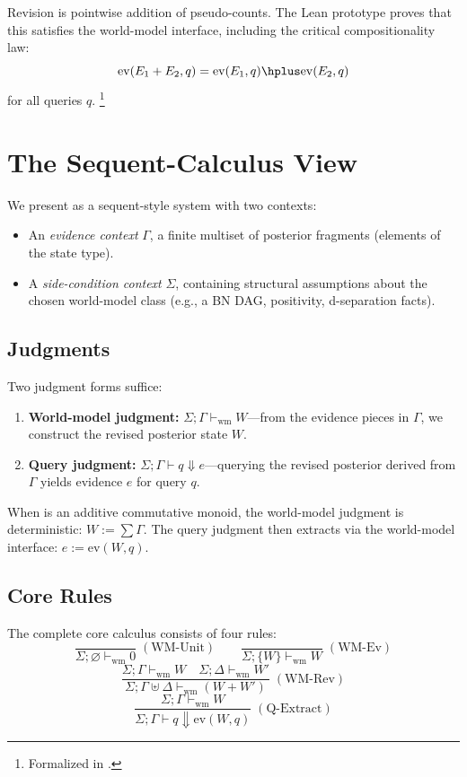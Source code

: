 \documentclass[11pt,openany]{report}
\begin{document}
Revision is pointwise addition of pseudo-counts.  The Lean prototype proves
that this satisfies the world-model interface, including the critical
compositionality law:
\[
  \mathrm{ev}(E_1 + E_2, q) = \mathrm{ev}(E_1, q) \hplus \mathrm{ev}(E_2, q)
\]
for all queries $q$.%
\footnote{Formalized in .}

\section{The Sequent-Calculus View}

We present \xiPLN{} as a sequent-style system with two contexts:
\begin{itemize}
\item An \emph{evidence context} $\Gamma$, a finite multiset of posterior
  fragments (elements of the state type).
\item A \emph{side-condition context} $\Sigma$, containing structural
  assumptions about the chosen world-model class (e.g., a BN DAG,
  positivity, d-separation facts).
\end{itemize}

\subsection{Judgments}

Two judgment forms suffice:
\begin{enumerate}
\item \textbf{World-model judgment:}
  $\Sigma; \Gamma \vdash_{\mathrm{wm}} W$---from the evidence pieces in
  $\Gamma$, we construct the revised posterior state $W$.

\item \textbf{Query judgment:}
  $\Sigma; \Gamma \vdash q \Downarrow e$---querying the revised posterior
  derived from $\Gamma$ yields evidence $e$ for query $q$.
\end{enumerate}

When  is an additive commutative monoid, the world-model
judgment is deterministic: $W := \sum \Gamma$.  The query judgment then
extracts via the world-model interface: $e := \mathrm{ev}(W, q)$.

\subsection{Core Rules}

The complete core calculus consists of four rules:
\[
\frac{}{\Sigma; \varnothing \vdash_{\mathrm{wm}} 0}
\;(\text{WM-Unit})
\qquad
\frac{}{\Sigma; \{W\} \vdash_{\mathrm{wm}} W}
\;(\text{WM-Ev})
\]
\[
\frac{\Sigma; \Gamma \vdash_{\mathrm{wm}} W \quad
      \Sigma; \Delta \vdash_{\mathrm{wm}} W'}
     {\Sigma; \Gamma \uplus \Delta \vdash_{\mathrm{wm}} (W + W')}
\;(\text{WM-Rev})
\]
\[
\frac{\Sigma; \Gamma \vdash_{\mathrm{wm}} W}
     {\Sigma; \Gamma \vdash q \Downarrow \mathrm{ev}(W, q)}
\;(\text{Q-Extract})
\]
\end{document}
